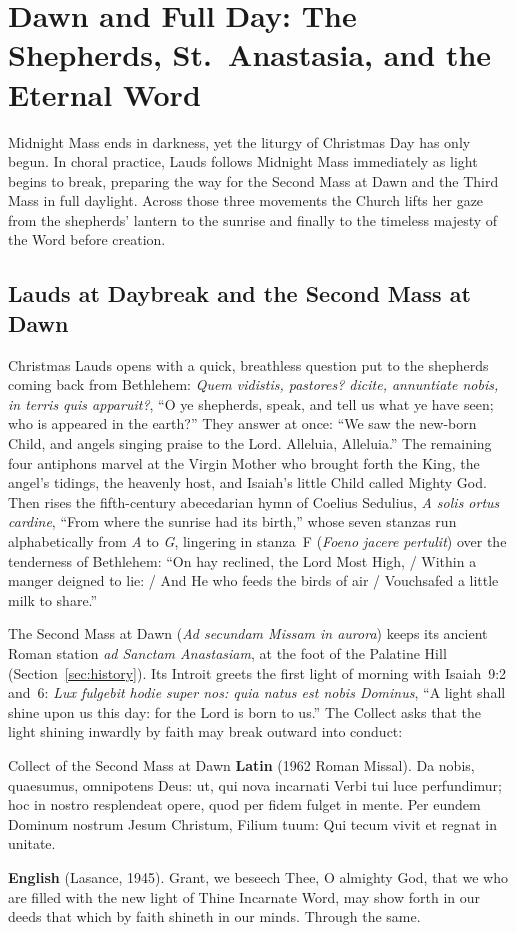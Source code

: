 \section{Dawn and Full Day: The Shepherds, St.~Anastasia, and the Eternal Word}\label{sec:dawn-day}

Midnight Mass ends in darkness, yet the liturgy of Christmas Day has only begun.
In choral practice, Lauds follows Midnight Mass immediately as light begins to
break, preparing the way for the Second Mass at Dawn and the Third Mass in full
daylight. Across those three movements the Church lifts her gaze from the
shepherds' lantern to the sunrise and finally to the timeless majesty of the
Word before creation.

\subsection{Lauds at Daybreak and the Second Mass at Dawn}

Christmas Lauds opens with a quick, breathless question put to the shepherds
coming back from Bethlehem: \textit{Quem vidistis, pastores? dicite, annuntiate
nobis, in terris quis apparuit?}, ``O ye shepherds, speak, and tell us what ye
have seen; who is appeared in the earth?'' They answer at once: ``We saw the
new-born Child, and angels singing praise to the Lord. Alleluia, Alleluia.'' The
remaining four antiphons marvel at the Virgin Mother who brought forth the King,
the angel's tidings, the heavenly host, and Isaiah's little Child called Mighty
God. Then rises the fifth-century abecedarian hymn of Coelius Sedulius,
\textit{A solis ortus cardine}, ``From where the sunrise had its birth,'' whose
seven stanzas run alphabetically from \textit{A} to \textit{G}, lingering in
stanza~F (\textit{Foeno jacere pertulit}) over the tenderness of Bethlehem: ``On
hay reclined, the Lord Most High, / Within a manger deigned to lie: / And He who
feeds the birds of air / Vouchsafed a little milk to share.''

The Second Mass at Dawn (\textit{Ad secundam Missam in aurora}) keeps its
ancient Roman station \textit{ad Sanctam Anastasiam}, at the foot of the
Palatine Hill (Section~\ref{sec:history}). Its Introit greets the first light of
morning with Isaiah~9:2 and~6: \textit{Lux fulgebit hodie super nos: quia natus
est nobis Dominus}, ``A light shall shine upon us this day: for the Lord is born
to us.'' The Collect asks that the light shining inwardly by faith may break
outward into conduct:

\begin{massbox}{Collect of the Second Mass at Dawn}
\textbf{Latin} (1962 Roman Missal). Da nobis, quaesumus, omnipotens Deus: ut,
qui nova incarnati Verbi tui luce perfundimur; hoc in nostro resplendeat opere,
quod per fidem fulget in mente. Per eundem Dominum nostrum Jesum Christum,
Filium tuum: Qui tecum vivit et regnat in unitate.

\textbf{English} (Lasance, 1945). Grant, we beseech Thee, O almighty God, that
we who are filled with the new light of Thine Incarnate Word, may show forth in
our deeds that which by faith shineth in our minds. Through the same.
\end{massbox}

